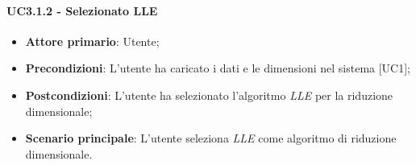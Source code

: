 \paragraph{UC3.1.2 - Selezionato LLE}
\begin{itemize}
	\item \textbf{Attore primario}: Utente;
	\item \textbf{Precondizioni}: L'utente ha caricato i dati e le dimensioni nel sistema [UC1];
	\item \textbf{Postcondizioni}: L'utente ha selezionato l'algoritmo \textit{LLE} per la riduzione dimensionale;
	\item \textbf{Scenario principale}: L'utente seleziona \textit{LLE} come algoritmo di riduzione dimensionale.

\end{itemize}